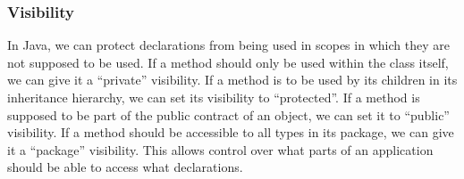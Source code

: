 \subsubsection{Visibility}
In Java, we can protect declarations from being used in scopes in which they are not supposed to be used. If a method should only be used within the class itself, we can give it a ``private'' visibility. If a method is to be used by its children in its inheritance hierarchy, we can set its visibility to ``protected''. If a method is supposed to be part of the public contract of an object, we can set it to ``public'' visibility. If a method should be accessible to all types in its package, we can give it a ``package'' visibility. This allows control over what parts of an application should be able to access what declarations.
